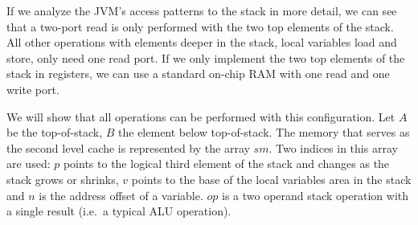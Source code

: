If we analyze the JVM's access patterns to the stack in more detail,
we can see that a two-port read is only performed with the two top
elements of the stack. All other operations with elements deeper in
the stack, local variables load and store, only need one read port.
If we only implement the two top elements of the stack in registers,
we can use a standard on-chip RAM with one read and one write port.

We will show that all operations can be performed with this
configuration. Let $A$ be the top-of-stack, $B$ the element below
top-of-stack. The memory that serves as the second level cache is
represented by the array $sm$. Two indices in this array are used:
$p$ points to the logical third element of the stack and changes as
the stack grows or shrinks, $v$ points to the base of the local
variables area in the stack and $n$ is the address offset of a
variable. $op$ is a two operand stack operation with a single result
(i.e.\ a typical ALU operation).


